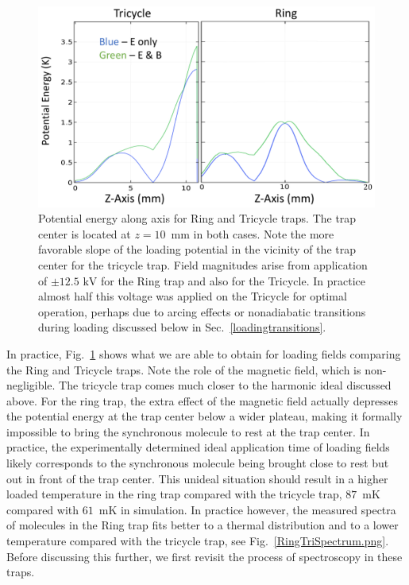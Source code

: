 \documentclass[defaultstyle,11pt]{thesis}
\begin{document}
\begin{figure}[t!]
\centering
\includegraphics[width=14cm]{LoadingFieldsEB.png}
\caption[On-Axis Loading for Ring and Tricycle]{\label{loadingringtrike}
Potential energy along axis for Ring and Tricycle traps. The trap center is located at $z=10$~mm in both cases. Note the more favorable slope of the loading potential in the vicinity of the trap center for the tricycle trap. Field magnitudes arise from application of $\pm12.5\text{ kV}$ for the Ring trap and also for the Tricycle. In practice almost half this voltage was applied on the Tricycle for optimal operation, perhaps due to arcing effects or nonadiabatic transitions during loading discussed below in Sec.~\ref{loadingtransitions}.
}
\end{figure}

In practice, Fig.~\ref{loadingringtrike} shows what we are able to obtain for loading fields comparing the Ring and Tricycle traps.
Note the role of the magnetic field, which is non-negligible.
The tricycle trap comes much closer to the harmonic ideal discussed above.
For the ring trap, the extra effect of the magnetic field actually depresses the potential energy at the trap center below a wider plateau, making it formally impossible to bring the synchronous molecule to rest at the trap center.
In practice, the experimentally determined ideal application time of loading fields likely corresponds to the synchronous molecule being brought close to rest but out in front of the trap center.
This unideal situation should result in a higher loaded temperature in the ring trap compared with the tricycle trap, $87$~mK compared with $61$~mK in simulation.
In practice however, the measured spectra of molecules in the Ring trap fits better to a thermal distribution and to a lower temperature compared with the tricycle trap, see Fig.~\ref{RingTriSpectrum.png}.
Before discussing this further, we first revisit the process of spectroscopy in these traps.
\end{document}
